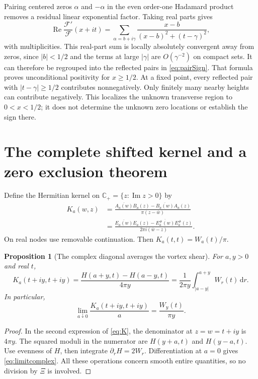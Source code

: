 \documentclass[11pt,letterpaper]{article}
\numberwithin{equation}{section}
\newtheorem{proposition}[theorem]{Proposition}
\theoremstyle{definition}
\theoremstyle{remark}
\newcommand{\Cp}{\mathbb C_+}
\newcommand{\dd}{\,\mathrm d}
\newcommand{\Repart}{\operatorname{Re}}
\newcommand{\Impart}{\operatorname{Im}}
\begin{document}
Pairing centered zeros $\alpha$ and $-\alpha$ in the even order-one Hadamard product removes a residual linear exponential factor. Taking real parts gives
\begin{equation}\label{eq:unconditionalZeroSum}
\Repart\frac{\mathcal F'}{\mathcal F}(x+it)
=\sum_{\alpha=b+i\gamma}\frac{x-b}{(x-b)^2+(t-\gamma)^2},
\end{equation}
with multiplicities. This real-part sum is locally absolutely convergent away from zeros, since $|b|<1/2$ and the terms at large $|\gamma|$ are $O(\gamma^{-2})$ on compact sets. It can therefore be regrouped into the reflected pairs in \eqref{eq:pairSign}. That formula proves unconditional positivity for $x\ge1/2$. At a fixed point, every reflected pair with $|t-\gamma|\ge1/2$ contributes nonnegatively. Only finitely many nearby heights can contribute negatively. This localizes the unknown transverse region to $0<x<1/2$; it does not determine the unknown zero locations or establish the sign there.

\section{The complete shifted kernel and a zero exclusion theorem}
Define the Hermitian kernel on $\Cp=\{z:\Impart z>0\}$ by
\begin{equation}\label{eq:K}
\begin{aligned}
K_a(w,z)
&=\frac{\overline{A_a(w)}B_a(z)-\overline{B_a(w)}A_a(z)}{\pi(z-\bar w)}\\
&=\frac{\overline{E_a(w)}E_a(z)-\overline{E_a^\#(w)}E_a^\#(z)}{2\pi i(\bar w-z)}.
\end{aligned}
\end{equation}
On real nodes use removable continuation. Then $K_a(t,t)=W_a(t)/\pi$.

\begin{proposition}[The complex diagonal averages the vortex shear]\label{prop:average}
For $a,y>0$ and real $t$,
\begin{equation}\label{eq:average}
K_a(t+iy,t+iy)
=\frac{H(a+y,t)-H(a-y,t)}{4\pi y}
=\frac1{2\pi y}\int_{|a-y|}^{a+y}W_r(t)\dd r.
\end{equation}
In particular,
\begin{equation}\label{eq:limitcomplex}
\lim_{a\downarrow0}\frac{K_a(t+iy,t+iy)}a
=\frac{W_y(t)}{\pi y}.
\end{equation}
\end{proposition}
\begin{proof}
In the second expression of \eqref{eq:K}, the denominator at $z=w=t+iy$ is $4\pi y$. The squared moduli in the numerator are $H(y+a,t)$ and $H(y-a,t)$. Use evenness of $H$, then integrate $\partial_rH=2W_r$. Differentiation at $a=0$ gives \eqref{eq:limitcomplex}. All these operations concern smooth entire quantities, so no division by $\Xi$ is involved.
\end{proof}
\end{document}
